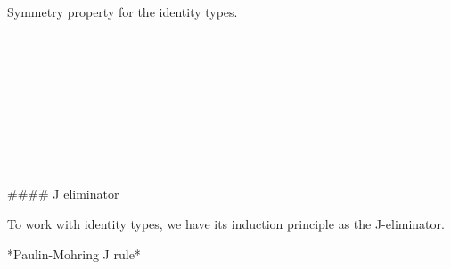 Symmetry property for the identity types.

\begin{code}%
\>[0]\<%
\\
\>[0][@{}l@{\AgdaIndent{0}}]%
\>[2]\AgdaSymbol{:}\AgdaSpace{}%
\AgdaSpace{}%
\AgdaSymbol{\{}\AgdaSpace{}%
\AgdaSymbol{:}\AgdaSpace{}%
\AgdaSpace{}%
\AgdaSymbol{\}\{}\AgdaSpace{}%
\AgdaSpace{}%
\AgdaSymbol{:}\AgdaSpace{}%
\AgdaSymbol{\}}\<%
\\
%
\>[2]\AgdaSpace{}%
\AgdaSpace{}%
\AgdaOperator{\AgdaDatatype{==}}\AgdaSpace{}%
\<%
\\
%
\>[2]\AgdaComment{----------------------------}\<%
\\
%
\>[2]\AgdaSpace{}%
\AgdaSpace{}%
\AgdaOperator{\AgdaDatatype{==}}\AgdaSpace{}%
\<%
\\
%
\\[\AgdaEmptyExtraSkip]%
\>[0]\AgdaSpace{}%
\AgdaSpace{}%
\AgdaSymbol{=}\AgdaSpace{}%
\<%
\\
%
\\[\AgdaEmptyExtraSkip]%
\>[0]\AgdaSpace{}%
\AgdaSpace{}%
\AgdaSpace{}%
\AgdaSymbol{=}\AgdaSpace{}%
\AgdaSpace{}%
\<%
\end{code}

#### J eliminator

To work with identity types, we have its induction principle as the J-eliminator.


*Paulin-Mohring J rule*

